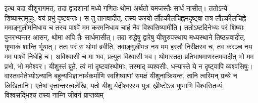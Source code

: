 \vakya इत्थ यदा यीशुरागमत्, तदा द्वादशानां मध्ये गणितः थोमा अर्थतो यमजस्तैः सार्धं नासीत्।
\vakya ततोऽन्ये शिष्यास्तमूचुः, वयं प्रभुं दृष्टवन्तः। स तु तानवादीत्, तस्य करयो र्लौहकीलचिह्नमदृष्ट्वा तत्र लौहकीलचिह्ने ममाङ्गुलीमनिधाय च तस्य पार्श्वे मम करमनिधाय चाहं नैव विश्वसिष्यामीति।
\vakya ततोऽष्टदिनेभ्यः परं शिष्याः पुनरभ्यन्तर आसन्, थोमा अपि तैः सार्धमासीत्। तदा रुद्धेषु द्वारेषु यीशुरुपस्थाय मध्यस्थाने तिष्ठन्नवादीत्, युष्माकं शान्ति र्भूयात्।
\vakya ततः परं स थोमां ब्रवीति, तवाङ्गुलीमत्र नय मम हस्तौ निरीक्षस्व च, तव करञ्च नय मम पार्श्वे निधेहि च। अविश्वासी च मा भव, प्रत्युत विश्वासी भव।
\vakya थोमास्तदा प्रतिभाषमाणस्तमवादीत् भो मम प्रभो, भो ममेश्वर।
\vakya यीशुस्तं ब्रूते, त्वं मां दृष्टवांस्थोमाः, तस्माद् व्यश्वसीः, धन्यास्ते ये न दृष्ट्वापि व्यश्वसिषुः।
\vakya वास्तवमेतेभ्योऽन्यानि बहून्यभिज्ञानार्थकर्माणि स्वशिष्याणां समक्षं यीशुनाक्रियन्त, तानि त्वस्मिन् ग्रन्थे न लिखितानि।
\vakya एतेषां वृत्तान्तस्त्वलेखि, यतो यीशु र्यदीश्वरस्य पुत्रः ख्रीष्टोऽत्र युष्माभि र्विश्वसितव्यं, विश्वसद्भिश्च तस्य नाम्नि जीवनं प्राप्तव्यम्\eoc